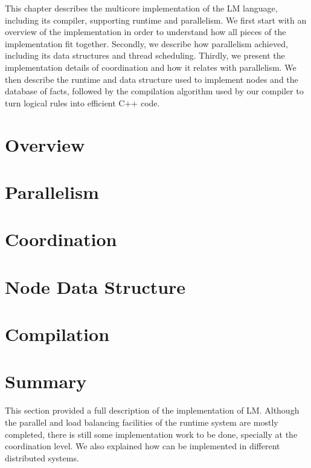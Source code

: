 This chapter describes the multicore implementation of the LM language,
including its compiler, supporting runtime and parallelism. We first start with
an overview of the implementation in order to understand how all pieces of the
implementation fit together. Secondly, we describe how parallelism achieved,
including its data structures and thread scheduling. Thirdly, we present the
implementation details of coordination and how it relates with parallelism.  We
then describe the runtime and data structure used to implement nodes and the
database of facts, followed by the compilation algorithm used by our compiler to
turn logical rules into efficient C++ code.

\section{Overview}


\section{Parallelism}


\section{Coordination}


\section{Node Data Structure}\label{sec:data_structures}


\section{Compilation}


\section{Summary}

This section provided a full description of the implementation of LM. Although the parallel and load balancing facilities of the
runtime system are mostly completed, there is still some implementation work to be done, specially at the coordination level.
We also explained how \lang can be implemented in different distributed systems.
